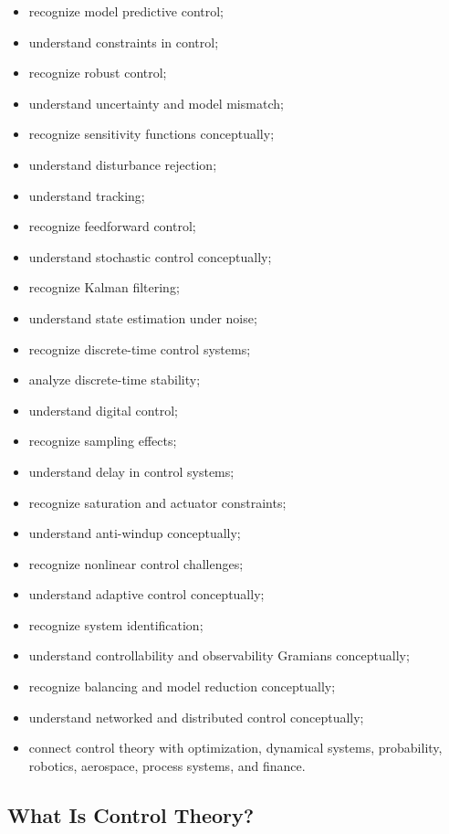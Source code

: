 {\begin{itemize}
    \item recognize model predictive control;
    \item understand constraints in control;
    \item recognize robust control;
    \item understand uncertainty and model mismatch;
    \item recognize sensitivity functions conceptually;
    \item understand disturbance rejection;
    \item understand tracking;
    \item recognize feedforward control;
    \item understand stochastic control conceptually;
    \item recognize Kalman filtering;
    \item understand state estimation under noise;
    \item recognize discrete-time control systems;
    \item analyze discrete-time stability;
    \item understand digital control;
    \item recognize sampling effects;
    \item understand delay in control systems;
    \item recognize saturation and actuator constraints;
    \item understand anti-windup conceptually;
    \item recognize nonlinear control challenges;
    \item understand adaptive control conceptually;
    \item recognize system identification;
    \item understand controllability and observability Gramians conceptually;
    \item recognize balancing and model reduction conceptually;
    \item understand networked and distributed control conceptually;
    \item connect control theory with optimization, dynamical systems,
          probability, robotics, aerospace, process systems, and finance.
\end{itemize}
}

\subsection{What Is Control Theory?}
\label{subsec:what-is-control-theory}


